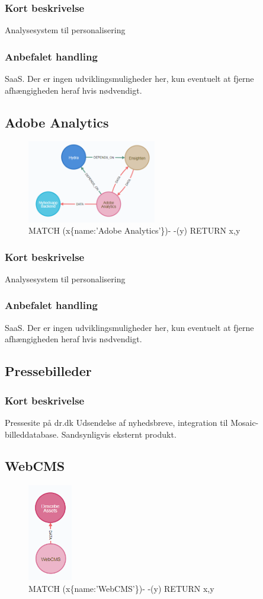\documentclass{article}
\begin{document}
\subsubsection*{Kort beskrivelse}
Analysesystem til personalisering
\subsubsection*{Anbefalet handling}
SaaS. Der er ingen udviklingsmuligheder her, kun eventuelt at fjerne afhængigheden heraf hvis nødvendigt.



\subsection{Adobe Analytics}
\begin{figure}[h]
\includegraphics[width=160pt]{AdobeAnalytics.PNG}
\caption{MATCH (x\{name:'Adobe Analytics'\})- -(y) RETURN x,y}
\end{figure}
\subsubsection*{Kort beskrivelse}
Analysesystem til personalisering
\subsubsection*{Anbefalet handling}
SaaS. Der er ingen udviklingsmuligheder her, kun eventuelt at fjerne afhængigheden heraf hvis nødvendigt.



\subsection{Pressebilleder}
\subsubsection*{Kort beskrivelse}
Pressesite på dr.dk Udsendelse af nyhedsbreve, integration til Mosaic-billeddatabase. Sandsynligvis eksternt produkt.

\subsection{WebCMS}
\begin{figure}[h]
\includegraphics[height=120pt]{WebCMS.PNG}
\caption{MATCH (x\{name:'WebCMS'\})- -(y) RETURN x,y}
\end{figure}
\end{document}
